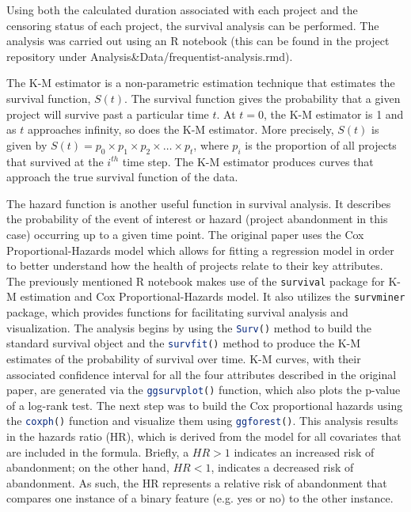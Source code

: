 \documentclass[acmconf]{acmart}
\begin{document}
Using both the calculated duration associated with each project and the censoring status of each project, the survival analysis can be performed.
The analysis was carried out using an R notebook (this can be found in the project repository under Analysis\&Data/frequentist-analysis.rmd).

The K-M estimator is a non-parametric estimation technique that estimates the survival function, $S(t)$.
The survival function gives the probability that a given project will survive past a particular time $t$.
At $t = 0$, the K-M estimator is 1 and as $t$ approaches infinity, so does the K-M estimator.
More precisely, $S(t)$ is given by  $S(t) = p_0 \times p_1 \times p_2 \times \dots \times p_t$, where $p_i$ is the proportion of all projects that survived at the $i^{th}$ time step.
The K-M estimator produces curves that approach the true survival function of the data.

The hazard function is another useful function in survival analysis. It describes the probability of the event of interest or hazard (project abandonment in this case) occurring up to a given time point.
The original paper uses the Cox Proportional-Hazards model which allows for fitting a regression model in order to better understand how the health of projects relate to their key attributes. 
The previously mentioned R notebook makes use of the \lstinline[language=R]!survival! package for K-M estimation and Cox Proportional-Hazards model.
It also utilizes the \lstinline[language=R]!survminer! package, which provides functions for facilitating survival analysis and visualization. 
The analysis begins by using the \lstinline[language=R]!Surv()! method to build the standard survival object and the \lstinline[language=R]!survfit()! method to produce the K-M estimates of the probability of survival over time.
K-M curves, with their associated confidence interval for all the four attributes described in the original paper, are generated via the \lstinline[language=R]!ggsurvplot()! function, which also plots the p-value of a log-rank test. 
The next step was to build the Cox proportional hazards using the \lstinline[language=R]!coxph()! function and visualize them using \lstinline[language=R]!ggforest()!. 
This analysis results in the hazards ratio (HR), which is derived from the model for all covariates that are included in the formula. 
Briefly, a $HR > 1$ indicates an increased risk of abandonment; on the other hand, $HR < 1$, indicates a decreased risk of abandonment. 
As such, the HR represents a relative risk of abandonment that compares one instance of a binary feature (e.g. yes or no) to the other instance.
\end{document}
